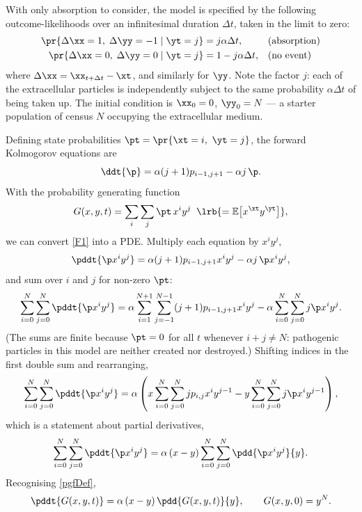 With only absorption to consider, the model is specified by the following
outcome-likelihoods over an infinitesimal duration $\Delta t$, taken in the limit to
zero:
\begin{align*}
     \pr{\Delta\xx= 1,\;\Delta\yy = -1 \;|\; \yt = j} &= j \alpha \Delta t,  &&\text{(absorption)}\\
     \pr{\Delta\xx= 0,\;\Delta\yy = 0 \;|\; \yt = j} &= 1 -  j \alpha \Delta t,  &&\text{(no event)}
\end{align*}
where $\Delta\xx = \xx_{t+\Delta t}-\xt$, and similarly for $\yy$. Note the factor
$j$: each of the extracellular particles is independently subject to the same
probability $\alpha\Delta t$ of being taken up. The initial condition is
$\xx_0 = 0$, $\yy_0 = N$ --- a starter population of census $N$ occupying the
extracellular medium.

Defining state probabilities $\pt = \pr{\xt=i,\ \yt=j}$, the forward Kolmogorov
equations are
\begin{equation}
\label{F1}
\ddt{\p} = \alpha(j+1)p_{i-1,j+1} - \alpha j\,\p .
\end{equation}
With the probability generating function
\begin{equation}
\label{pgfDef}
G(x,y,t) = \sum_i\sum_j \pt\, x^iy^j
\;\;\lrb{=\mathbb{E}\bigl[x^{\xt}y^{\yt}\bigr]},
\end{equation}
we can convert \cref{F1} into a PDE. Multiply each equation by $x^iy^j$,
\begin{equation*}
\pddt{\p x^iy^j} = \alpha(j+1)p_{i-1,j+1}x^iy^j - \alpha j\,\p x^iy^j ,
\end{equation*}
and sum over $i$ and $j$ for non-zero $\pt$:
\begin{equation}
\label{pdeDere2}
\sum_{i = 0}^N\sum_{j=0}^N\pddt{\p x^iy^j} = \alpha\sum_{i = 1}^{N+1}\sum_{j=-1}^{N-1}(j + 1) p_{i-1,j+1}x^iy^j - \alpha \sum_{i = 0}^N\sum_{j=0}^Nj \p x^iy^j.
\end{equation}
(The sums are finite because $\pt=0$ for all $t$ whenever $i+j\neq N$: pathogenic
particles in this model are neither created nor destroyed.) Shifting indices in the
first double sum and rearranging,
\begin{equation*}
\sum_{i = 0}^N\sum_{j=0}^N\pddt{\p x^iy^j} = \alpha\left(x\sum_{i = 0}^N\sum_{j=0}^N j p_{i,j}x^{i}y^{j-1} -  y\sum_{i = 0}^N\sum_{j=0}^Nj \p x^iy^{j-1} \right),
\end{equation*}
which is a statement about partial derivatives,
\begin{equation*}
\sum_{i = 0}^N\sum_{j=0}^N\pddt{\p x^iy^j} = \alpha\left(x - y\right)\sum_{i = 0}^N\sum_{j=0}^N \pdd{\p x^iy^j}{y}.
\end{equation*}
Recognising \cref{pgfDef},
\begin{equation}
\label{PDE1}
\pddt{G(x,y,t)} = \alpha\left(x - y\right) \pdd{G(x,y,t)}{y},
\qquad G(x,y,0) = y^N .
\end{equation}

